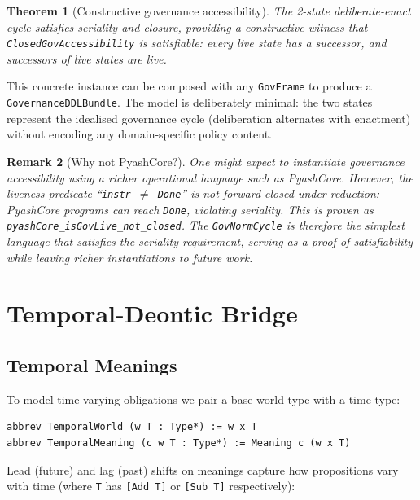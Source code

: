 \documentclass[]{article}
\newtheorem{theorem}{Theorem}
\newtheorem{remark}[theorem]{Remark}
\newcommand{\code}[1]{\texttt{#1}}
\begin{document}
\begin{theorem}[Constructive governance accessibility]
The 2-state deliberate-enact cycle satisfies seriality and closure,
providing a constructive witness that \code{ClosedGovAccessibility}
is satisfiable: every live state has a successor, and successors of
live states are live.
\end{theorem}

\noindent
This concrete instance can be composed with any \code{GovFrame} to produce a
\code{GovernanceDDLBundle}.  The model is deliberately minimal: the two states
represent the idealised governance cycle (deliberation alternates with
enactment) without encoding any domain-specific policy content.

\begin{remark}[Why not PyashCore?]
One might expect to instantiate governance accessibility using a richer
operational language such as PyashCore.  However, the liveness predicate
``\code{instr $\neq$ Done}'' is \emph{not} forward-closed under reduction:
PyashCore programs can reach \code{Done}, violating seriality.
This is proven as \code{pyashCore\_isGovLive\_not\_closed}.
The \code{GovNormCycle} is therefore the simplest language that satisfies
the seriality requirement, serving as a proof of satisfiability while
leaving richer instantiations to future work.
\end{remark}

\section{Temporal-Deontic Bridge}
\label{sec:temporal}

\subsection{Temporal Meanings}

To model time-varying obligations we pair a base world type with a time type:

\begin{lstlisting}
abbrev TemporalWorld (w T : Type*) := w x T
abbrev TemporalMeaning (c w T : Type*) := Meaning c (w x T)
\end{lstlisting}

\noindent
Lead (future) and lag (past) shifts on meanings capture how propositions vary
with time (where \code{T} has \code{[Add T]} or \code{[Sub T]} respectively):
\end{document}

